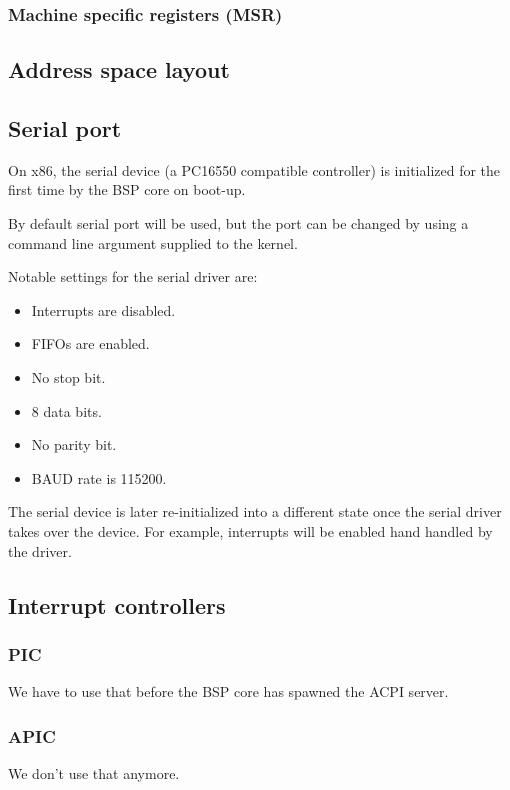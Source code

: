 \documentclass[a4paper,11pt,twoside]{report}
\begin{document}
{{\subsubsection{Machine specific registers (MSR)}

\subsection{Address space layout}

\subsection{Serial port}
On x86, the serial device (a PC16550 compatible controller) is initialized for the first time by the BSP core on boot-up.

By default serial port  will be used, but the port can be changed by
using a command line argument supplied to the kernel.

Notable settings for the serial driver are:
\begin{itemize}
    \item Interrupts are disabled.
    \item FIFOs are enabled.
    \item No stop bit.
    \item 8 data bits.
    \item No parity bit.
    \item BAUD rate is 115200.
\end{itemize}

The serial device is later re-initialized into a different state once the
serial driver takes over the device. For example, interrupts will be enabled
hand handled by the driver.


\subsection{Interrupt controllers}

\subsubsection{PIC}
We have to use that before the BSP core has spawned the ACPI server.

\subsubsection{APIC}
We don't use that anymore.

}}
\end{document}
